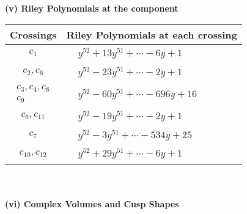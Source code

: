 \documentclass[1p]{elsarticle_modified}
\theoremstyle{definition}
\begin{document}
\newpage\renewcommand{\arraystretch}{1}
\flushleft \textbf{(v) Riley Polynomials at the component}\newline \\
\begin{tabular}{m{50pt}|m{274pt}}
Crossings & \hspace{64pt}Riley Polynomials at each crossing \\
\hline $$\begin{aligned}c_{1}\end{aligned}$$&$\begin{aligned}
&y^{52}+13 y^{51}+\cdots-6 y+1
\end{aligned}$\\
\hline $$\begin{aligned}c_{2},c_{6}\end{aligned}$$&$\begin{aligned}
&y^{52}-23 y^{51}+\cdots-2 y+1
\end{aligned}$\\
\hline $$\begin{aligned}c_{3},c_{4},c_{8}\\c_{9}\end{aligned}$$&$\begin{aligned}
&y^{52}-60 y^{51}+\cdots-696 y+16
\end{aligned}$\\
\hline $$\begin{aligned}c_{5},c_{11}\end{aligned}$$&$\begin{aligned}
&y^{52}-19 y^{51}+\cdots-2 y+1
\end{aligned}$\\
\hline $$\begin{aligned}c_{7}\end{aligned}$$&$\begin{aligned}
&y^{52}-3 y^{51}+\cdots-534 y+25
\end{aligned}$\\
\hline $$\begin{aligned}c_{10},c_{12}\end{aligned}$$&$\begin{aligned}
&y^{52}+29 y^{51}+\cdots-6 y+1
\end{aligned}$\\
\hline
\end{tabular}\\~\\
\newpage\flushleft \textbf{(vi) Complex Volumes and Cusp Shapes}
\end{document}

